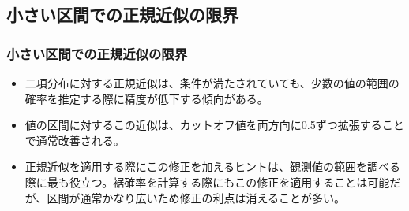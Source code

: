 
\subsection{小さい区間での正規近似の限界}


\begin{frame}
\frametitle{小さい区間での正規近似の限界}

\begin{itemize}

\item 二項分布に対する正規近似は、条件が満たされていても、少数の値の範囲の確率を推定する際に精度が低下する傾向がある。

\item 値の区間に対するこの近似は、カットオフ値を両方向に0.5ずつ拡張することで通常改善される。

\item 正規近似を適用する際にこの修正を加えるヒントは、観測値の範囲を調べる際に最も役立つ。裾確率を計算する際にもこの修正を適用することは可能だが、区間が通常かなり広いため修正の利点は消えることが多い。

\end{itemize}

\end{frame}

